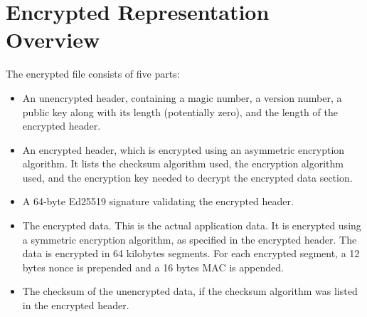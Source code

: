 \section{Encrypted Representation Overview}
The encrypted file consists of five parts:

\begin{itemize}
\item An unencrypted header, containing a magic number, a version
  number, a public key along with its length (potentially zero), and
  the length of the encrypted header.
\item An encrypted header, which is encrypted using an asymmetric
  encryption algorithm. 
  It lists the checksum algorithm used, the encryption algorithm used,
  and the encryption key needed to decrypt the encrypted data section.
\item A 64-byte Ed25519 signature validating the encrypted header.
\item The encrypted data.
  This is the actual application data.
  It is encrypted using a symmetric encryption algorithm, as specified
  in the encrypted header.
  The data is encrypted in 64 kilobytes segments. For each encrypted
  segment, a 12 bytes nonce is prepended and a 16 bytes MAC is appended.
\item The checksum of the unencrypted data, if the checksum algorithm
  was listed in the encrypted header.
\end{itemize}
